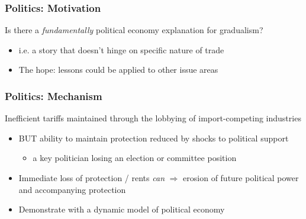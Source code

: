 \documentclass[handout]{beamer}
\begin{document}


\begin{frame}
\frametitle{Politics: Motivation}

Is there a \textit{fundamentally} political economy explanation for gradualism?
\begin{itemize}
	\item i.e. a story that doesn't hinge on specific nature of trade
	\item The hope: lessons could be applied to other issue areas
\end{itemize}

\end{frame}


\begin{frame}
\frametitle{Politics: Mechanism}

Inefficient tariffs maintained through the lobbying of import-competing industries
\begin{itemize}
	\item BUT ability to maintain protection reduced by shocks to political support
		\begin{itemize}
			\item a key politician losing an election or committee position
		\end{itemize}
	\item Immediate loss of protection / rents \textit{can} $\Rightarrow$ erosion of future political power and accompanying protection
	\item Demonstrate with a dynamic model of political economy
\end{itemize}

\end{frame}
\end{document}
